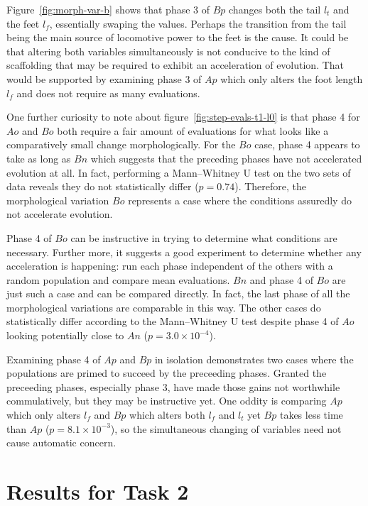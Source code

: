 Figure~\ref{fig:morph-var-b} shows that phase 3 of $Bp$ changes both
the tail $l_t$ and the feet $l_f$, essentially swaping the values.
Perhaps the transition from the tail being the main source of
locomotive power to the feet is the cause.  It could be that altering
both variables simultaneously is not conducive to the kind of
scaffolding that may be required to exhibit an acceleration of
evolution.  That would be supported by examining phase 3 of $Ap$ which
only alters the foot length $l_f$ and does not require as many
evaluations.

One further curiosity to note about figure~\ref{fig:step-evals-t1-l0}
is that phase 4 for $Ao$ and $Bo$ both require a fair amount of
evaluations for what looks like a comparatively small change
morphologically.  For the $Bo$ case, phase 4 appears to take as long
as $Bn$ which suggests that the preceding phases have not accelerated
evolution at all.  In fact, performing a Mann--Whitney U test on the
two sets of data reveals they do not statistically differ ($p =
0.74$).  Therefore, the morphological variation $Bo$ represents a case
where the conditions assuredly do not accelerate evolution.

Phase 4 of $Bo$ can be instructive in trying to determine what
conditions are necessary.  Further more, it suggests a good experiment
to determine whether any acceleration is happening: run each phase
independent of the others with a random population and compare mean
evaluations.  $Bn$ and phase 4 of $Bo$ are just such a case and can be
compared directly.  In fact, the last phase of all the morphological
variations are comparable in this way. The other cases do
statistically differ according to the Mann--Whitney U test despite
phase 4 of $Ao$ looking potentially close to $An$ ($p = 3.0 \times
10^{-4}$).

Examining phase 4 of $Ap$ and $Bp$ in isolation demonstrates two cases
where the populations are primed to succeed by the preceeding phases.
Granted the preceeding phases, especially phase 3, have made those
gains not worthwhile commulatively, but they may be instructive yet.
One oddity is comparing $Ap$ which only alters $l_f$ and $Bp$ which
alters both $l_f$ and $l_t$ yet $Bp$ takes less time than $Ap$ ($p =
8.1 \times 10^{-3}$), so the simultaneous changing of variables need
not cause automatic concern.

\section{Results for Task 2}


